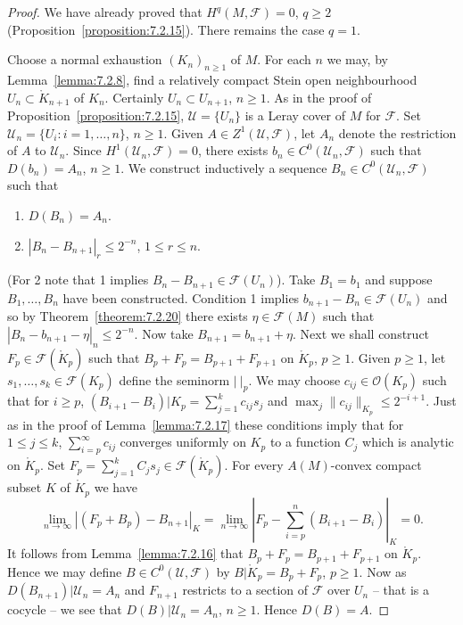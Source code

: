 \begin{proof}
We have already proved that $H^q(M,\mathcal F)=0$, $q\geq2$ (Proposition~\ref{proposition:7.2.15}). There remains the case $q=1$.

Choose a normal exhaustion $(K_n)_{n\geq1}$ of $M$. For each $n$ we may, by Lemma~\ref{lemma:7.2.8}, find a relatively compact Stein open neighbourhood $U_n\subset\mathring K_{n+1}$ of $K_n$. Certainly $U_n\subset U_{n+1}$, $n\geq1$. As in the proof of Proposition~\ref{proposition:7.2.15}, $\mathcal U=\{U_n\}$ is a Leray cover of $M$ for $\mathcal F$. Set $\mathcal U_n=\{U_i:i=1,\ldots,n\}$, $n\geq1$. Given $A\in Z^1(\mathcal U,\mathcal F)$, let $A_n$ denote the restriction of $A$ to $\mathcal U_n$. Since $H^1(\mathcal U_n,\mathcal F)=0$, there exists $b_n\in C^0(\mathcal U_n,\mathcal F)$ such that $D(b_n)=A_n$, $n\geq1$. We construct inductively a sequence $B_n\in C^0(\mathcal U_n,\mathcal F)$ such that
\begin{enumerate}[label=\arabic*.]
\item $D(B_n)=A_n$.
\item $|B_n-B_{n+1}|_r\leq2^{-n}$, $1\leq r\leq n$.
\end{enumerate}
(For 2 note that 1 implies $B_n-B_{n+1}\in\mathcal F(U_n)$). Take $B_1=b_1$ and suppose $B_1,\ldots,B_n$ have been constructed. Condition 1 implies $b_{n+1}-B_n\in\mathcal F(U_n)$ and so by Theorem~\ref{theorem:7.2.20} there exists $\eta\in\mathcal F(M)$ such that $|B_n-b_{n+1}-\eta|_n\leq2^{-n}$. Now take $B_{n+1}=b_{n+1}+\eta$. Next we shall construct $F_p\in\mathcal F(\mathring K_p)$ such that $B_p+F_p=B_{p+1}+F_{p+1}$ on $\mathring K_p$, $p\geq1$. Given $p\geq1$, let $s_1,\ldots,s_k\in\mathcal F(K_p)$ define the seminorm $|\ |_p$. We may choose $c_{ij}\in\mathcal O(K_p)$ such that for $i\geq p$, $(B_{i+1}-B_i)|K_p=\sum_{j=1}^k c_{ij}s_j$ and $\max_j\|c_{ij}\|_{K_p}\leq2^{-i+1}$. Just as in the proof of Lemma~\ref{lemma:7.2.17} these conditions imply that for $1\leq j\leq k$, $\sum_{i=p}^\infty c_{ij}$ converges uniformly on $K_p$ to a function $C_j$ which is analytic on $\mathring K_p$. Set $F_p=\sum_{j=1}^k C_js_j\in\mathcal F(\mathring K_p)$. For every $A(M)$-convex compact subset $K$ of $\mathring K_p$ we have
\[
\lim_{n\to\infty}|(F_p+B_p)-B_{n+1}|_K
=\lim_{n\to\infty}\left|F_p-\sum_{i=p}^n(B_{i+1}-B_i)\right|_K=0.
\]
It follows from Lemma~\ref{lemma:7.2.16} that $B_p+F_p=B_{p+1}+F_{p+1}$ on $\mathring K_p$. Hence we may define $B\in C^0(\mathcal U,\mathcal F)$ by $B|\mathring K_p=B_p+F_p$, $p\geq1$. Now as $D(B_{n+1})|\mathcal U_n=A_n$ and $F_{n+1}$ restricts to a section of $\mathcal F$ over $U_n$ -- that is a cocycle -- we see that $D(B)|\mathcal U_n=A_n$, $n\geq1$. Hence $D(B)=A$.
\end{proof}
